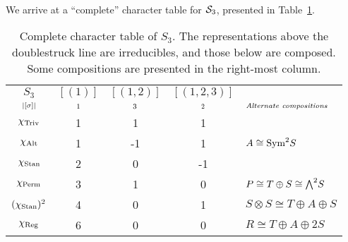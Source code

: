 	\paragraph{} We arrive at a ``complete'' character table for $\mathcal{S}_3$, presented in Table~\ref{table:completecharS3}.
	
	\begin{table}[hbt!]
		\centering
		
		\begin{tabular}{c | c c c | l}
			$S_3$         & $[(1)]$   & $[(1,2)]$  & $[(1,2,3)]$ &                                          \\
			$\scriptstyle|[\sigma]|$    & $\scriptstyle 1$ & $\scriptstyle 3$ & $\scriptstyle 2$ &  $\scriptstyle\textit{Alternate compositions}$         \\ \hline
			$\chi_{\text{Triv}}$       & 1       & 1       & 1       &                                          \\
			$\chi_{\text{Alt}}$       & 1       & -1      & 1       & $ A \cong \text{Sym}^2S$                       \\
			$\chi_{\text{Stan}}$       & 2       & 0       & -1      &                                          \\ \hline\hline
			$\chi_{\text{Perm}}$       & 3       & 1       & 0       & $ P \cong T \oplus S \cong {\bigwedge}^2S$ \\
			$(\chi_{\text{Stan}})^2$ & 4       & 0       & 1       & $ S \otimes S \cong T \oplus A \oplus S$ \\
			$\chi_{\text{Reg}}$       & 6       & 0       & 0       & $ R \cong T \oplus A \oplus 2S$
		\end{tabular}
			
		\caption{Complete character table of $S_3$. The representations above the doublestruck line are irreducibles, and those below are composed. Some compositions are presented in the right-most column.}
		\label{table:completecharS3}
	\end{table}

